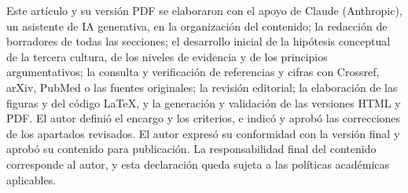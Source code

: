 \documentclass[11pt,a4paper]{article}
\begin{document}
\begin{recuadro}
Este artículo y su versión PDF se elaboraron con el apoyo de Claude (Anthropic), un asistente de IA generativa, en la organización del contenido; la redacción de borradores de todas las secciones; el desarrollo inicial de la hipótesis conceptual de la tercera cultura, de los niveles de evidencia y de los principios argumentativos; la consulta y verificación de referencias y cifras con Crossref, arXiv, PubMed o las fuentes originales; la revisión editorial; la elaboración de las figuras y del código LaTeX, y la generación y validación de las versiones HTML y PDF. El autor definió el encargo y los criterios, e indicó y aprobó las correcciones de los apartados revisados. El autor expresó su conformidad con la versión final y aprobó su contenido para publicación. La responsabilidad final del contenido corresponde al autor, y esta declaración queda sujeta a las políticas académicas aplicables.
\end{recuadro}

\printbibliography[heading=bibintoc,title={Referencias}]
\end{document}
